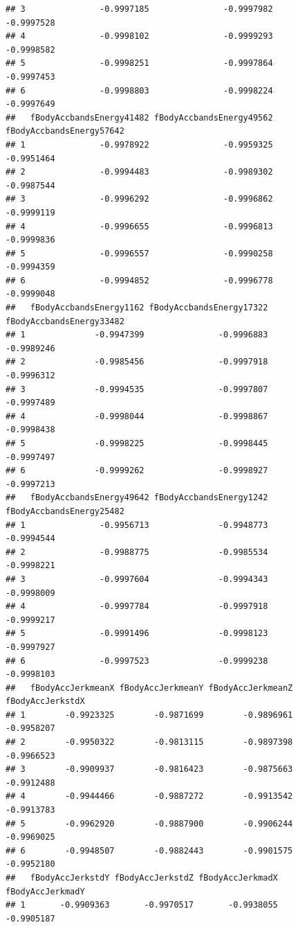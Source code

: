 \documentclass[
]{article}
\begin{document}
\begin{verbatim}
## 3               -0.9997185               -0.9997982               -0.9997528
## 4               -0.9998102               -0.9999293               -0.9998582
## 5               -0.9998251               -0.9997864               -0.9997453
## 6               -0.9998803               -0.9998224               -0.9997649
##   fBodyAccbandsEnergy41482 fBodyAccbandsEnergy49562 fBodyAccbandsEnergy57642
## 1               -0.9978922               -0.9959325               -0.9951464
## 2               -0.9994483               -0.9989302               -0.9987544
## 3               -0.9996292               -0.9996862               -0.9999119
## 4               -0.9996655               -0.9996813               -0.9999836
## 5               -0.9996557               -0.9990258               -0.9994359
## 6               -0.9994852               -0.9996778               -0.9999048
##   fBodyAccbandsEnergy1162 fBodyAccbandsEnergy17322 fBodyAccbandsEnergy33482
## 1              -0.9947399               -0.9996883               -0.9989246
## 2              -0.9985456               -0.9997918               -0.9996312
## 3              -0.9994535               -0.9997807               -0.9997489
## 4              -0.9998044               -0.9998867               -0.9998438
## 5              -0.9998225               -0.9998445               -0.9997497
## 6              -0.9999262               -0.9998927               -0.9997213
##   fBodyAccbandsEnergy49642 fBodyAccbandsEnergy1242 fBodyAccbandsEnergy25482
## 1               -0.9956713              -0.9948773               -0.9994544
## 2               -0.9988775              -0.9985534               -0.9998221
## 3               -0.9997604              -0.9994343               -0.9998009
## 4               -0.9997784              -0.9997918               -0.9999217
## 5               -0.9991496              -0.9998123               -0.9997927
## 6               -0.9997523              -0.9999238               -0.9998103
##   fBodyAccJerkmeanX fBodyAccJerkmeanY fBodyAccJerkmeanZ fBodyAccJerkstdX
## 1        -0.9923325        -0.9871699        -0.9896961       -0.9958207
## 2        -0.9950322        -0.9813115        -0.9897398       -0.9966523
## 3        -0.9909937        -0.9816423        -0.9875663       -0.9912488
## 4        -0.9944466        -0.9887272        -0.9913542       -0.9913783
## 5        -0.9962920        -0.9887900        -0.9906244       -0.9969025
## 6        -0.9948507        -0.9882443        -0.9901575       -0.9952180
##   fBodyAccJerkstdY fBodyAccJerkstdZ fBodyAccJerkmadX fBodyAccJerkmadY
## 1       -0.9909363       -0.9970517       -0.9938055       -0.9905187

\end{verbatim}
\end{document}
